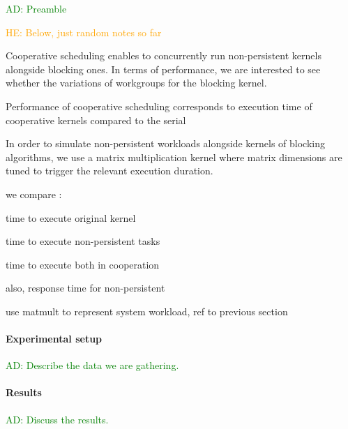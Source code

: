 \documentclass[numbers,nocopyrightspace,10pt]{sigplanconf}
\newcommand{\ADComment}[1]{\textcolor{green}{AD: #1}}
\newcommand{\HEComment}[1]{\textcolor{orange}{HE: #1}}
\begin{document}
\ADComment{Preamble}

\HEComment{Below, just random notes so far}

Cooperative scheduling enables to concurrently run non-persistent
kernels alongside blocking ones. In terms of performance, we are
interested to see whether the variations of workgroups for the blocking
kernel.

Performance of cooperative scheduling corresponds to execution time of
cooperative kernels compared to the serial

In order to simulate non-persistent workloads alongside kernels of
blocking algorithms, we use a matrix multiplication kernel where
matrix dimensions are tuned to trigger the relevant execution
duration.

we compare :

time to execute original kernel

time to execute non-persistent tasks

time to execute both in cooperation

also, response time for non-persistent

use matmult to represent system workload, ref to previous section

\paragraph{Experimental setup}  \ADComment{Describe the data we are gathering.}

\paragraph{Results}  \ADComment{Discuss the results.}
\end{document}

